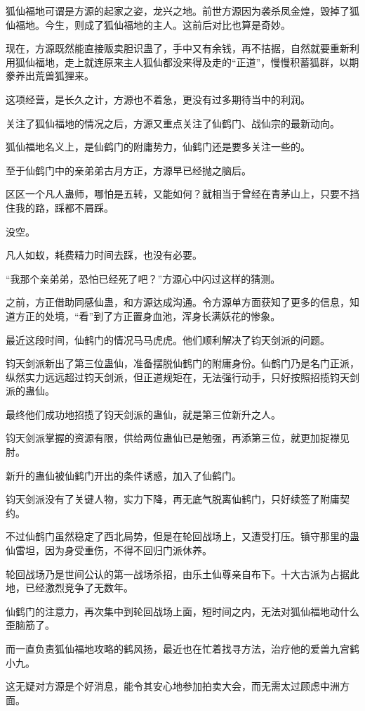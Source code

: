 \begin{this_body}
狐仙福地可谓是方源的起家之姿，龙兴之地。前世方源因为袭杀凤金煌，毁掉了狐仙福地。今生，则成了狐仙福地的主人。这前后对比也算是奇妙。

现在，方源既然能直接贩卖胆识蛊了，手中又有余钱，再不拮据，自然就要重新利用狐仙福地，走上就连原来主人狐仙都没来得及走的“正道”，慢慢积蓄狐群，以期豢养出荒兽狐狸来。

这项经营，是长久之计，方源也不着急，更没有过多期待当中的利润。

关注了狐仙福地的情况之后，方源又重点关注了仙鹤门、战仙宗的最新动向。

狐仙福地名义上，是仙鹤门的附庸势力，仙鹤门还是要多关注一些的。

至于仙鹤门中的亲弟弟古月方正，方源早已经抛之脑后。

区区一个凡人蛊师，哪怕是五转，又能如何？就相当于曾经在青茅山上，只要不挡住我的路，踩都不屑踩。

没空。

凡人如蚁，耗费精力时间去踩，也没有必要。

“我那个亲弟弟，恐怕已经死了吧？”方源心中闪过这样的猜测。

之前，方正借助同感仙蛊，和方源达成沟通。令方源单方面获知了更多的信息，知道方正的处境，“看”到了方正置身血池，浑身长满妖花的惨象。

最近这段时间，仙鹤门的情况马马虎虎。他们顺利解决了钧天剑派的问题。

钧天剑派新出了第三位蛊仙，准备摆脱仙鹤门的附庸身份。仙鹤门乃是名门正派，纵然实力远远超过钧天剑派，但正道规矩在，无法强行动手，只好按照招揽钧天剑派的蛊仙。

最终他们成功地招揽了钧天剑派的蛊仙，就是第三位新升之人。

钧天剑派掌握的资源有限，供给两位蛊仙已是勉强，再添第三位，就更加捉襟见肘。

新升的蛊仙被仙鹤门开出的条件诱惑，加入了仙鹤门。

钧天剑派没有了关键人物，实力下降，再无底气脱离仙鹤门，只好续签了附庸契约。

不过仙鹤门虽然稳定了西北局势，但是在轮回战场上，又遭受打压。镇守那里的蛊仙雷坦，因为身受重伤，不得不回归门派休养。

轮回战场乃是世间公认的第一战场杀招，由乐土仙尊亲自布下。十大古派为占据此地，已经激烈竞争了无数年。

仙鹤门的注意力，再次集中到轮回战场上面，短时间之内，无法对狐仙福地动什么歪脑筋了。

而一直负责狐仙福地攻略的鹤风扬，最近也在忙着找寻方法，治疗他的爱兽九宫鹤小九。

这无疑对方源是个好消息，能令其安心地参加拍卖大会，而无需太过顾虑中洲方面。


\end{this_body}

